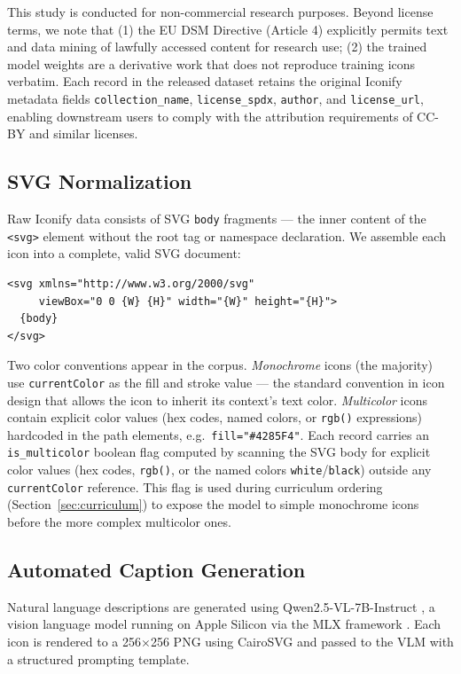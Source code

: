This study is conducted for non-commercial research purposes. Beyond license
terms, we note that (1) the EU DSM Directive (Article 4) explicitly permits
text and data mining of lawfully accessed content for research use; (2) the
trained model weights are a derivative work that does not reproduce training
icons verbatim. Each record in the released dataset retains the original
Iconify metadata fields \texttt{collection\_name}, \texttt{license\_spdx},
\texttt{author}, and \texttt{license\_url}, enabling downstream users to
comply with the attribution requirements of CC-BY and similar licenses.

\subsection{SVG Normalization}

Raw Iconify data consists of SVG \texttt{body} fragments — the inner content
of the \texttt{<svg>} element without the root tag or namespace declaration.
We assemble each icon into a complete, valid SVG document:

\begin{lstlisting}[style=svgstyle, caption={Assembled SVG document format}]
<svg xmlns="http://www.w3.org/2000/svg"
     viewBox="0 0 {W} {H}" width="{W}" height="{H}">
  {body}
</svg>
\end{lstlisting}

Two color conventions appear in the corpus. \emph{Monochrome} icons (the
majority) use \texttt{currentColor} as the fill and stroke value — the
standard convention in icon design that allows the icon to inherit its
context's text color. \emph{Multicolor} icons contain explicit color values
(hex codes, named colors, or \texttt{rgb()} expressions) hardcoded in the
path elements, e.g.\ \texttt{fill="\#4285F4"}. Each record carries an \texttt{is\_multicolor} boolean flag computed by
scanning the SVG body for explicit color values (hex codes, \texttt{rgb()},
or the named colors \texttt{white}/\texttt{black}) outside any
\texttt{currentColor} reference. This flag is used during curriculum
ordering (Section~\ref{sec:curriculum}) to expose the model to simple
monochrome icons before the more complex multicolor ones.

\subsection{Automated Caption Generation}
\label{sec:captioning}

Natural language descriptions are generated using Qwen2.5-VL-7B-Instruct
\citep{qwen25vl}, a vision language model running on Apple Silicon via the
MLX framework \citep{mlx2023}. Each icon is rendered to a 256$\times$256 PNG
using CairoSVG and passed to the VLM with a structured prompting template.

